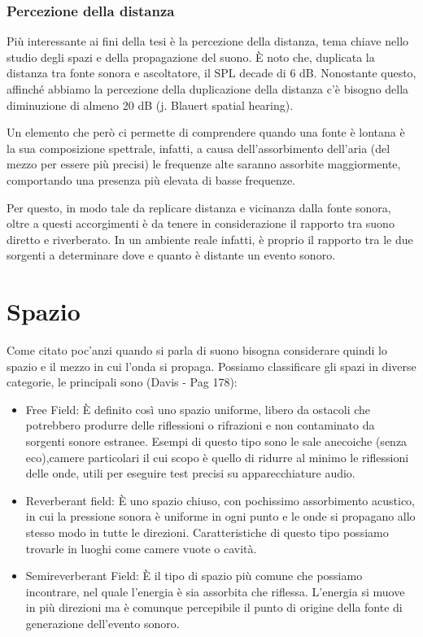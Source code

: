 \subsubsection{Percezione della distanza}
Più interessante ai fini della tesi è la percezione della distanza, tema chiave nello studio degli spazi e della propagazione del suono.
È noto che, duplicata la distanza tra fonte sonora e ascoltatore, il SPL decade di 6 dB.
Nonostante questo, affinché abbiamo la percezione della duplicazione della distanza c’è bisogno della diminuzione di almeno 20 dB (j. Blauert spatial hearing).

Un elemento che però ci permette di comprendere quando una fonte è lontana è la sua composizione spettrale, infatti, a causa dell’assorbimento dell’aria (del mezzo per essere più precisi) le frequenze alte saranno assorbite maggiormente, comportando una presenza più elevata di basse frequenze.

Per questo, in modo tale da replicare distanza e vicinanza dalla fonte sonora, oltre a questi accorgimenti è da tenere in considerazione il rapporto tra suono diretto e riverberato.
In un ambiente reale infatti, è proprio il rapporto tra le due sorgenti a determinare dove e quanto è distante un evento sonoro.

\section{Spazio}

Come citato poc'anzi quando si parla di suono bisogna considerare quindi lo spazio e il mezzo in cui l'onda si propaga.
Possiamo classificare gli spazi in diverse categorie, le principali sono (Davis - Pag 178):
\begin{itemize}
\item Free Field:
È definito così uno spazio uniforme, libero da ostacoli che potrebbero produrre delle riflessioni o rifrazioni e non contaminato da sorgenti sonore estranee.
Esempi di questo tipo sono le sale anecoiche (senza eco),camere particolari il cui scopo è quello di ridurre al minimo le riflessioni delle onde, utili per eseguire test precisi su apparecchiature audio.
\item Reverberant field:
È uno spazio chiuso, con pochissimo assorbimento acustico, in cui la pressione sonora è uniforme in ogni punto e le onde si propagano allo stesso modo in tutte le direzioni.
Caratteristiche di questo tipo possiamo trovarle in luoghi come camere vuote o cavità.
\item Semireverberant Field:
È il tipo di spazio più comune che possiamo incontrare, nel quale l’energia è sia assorbita che riflessa. L’energia si muove in più direzioni ma è comunque percepibile il punto di origine della fonte di generazione dell’evento sonoro.
\end{itemize}

